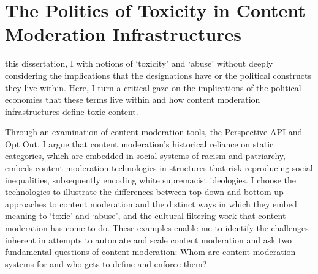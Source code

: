 \ifpdf
    \graphicspath{{Chapter7/Figs/Raster/}{Chapter7/Figs/PDF/}{Chapter7/Figs/}}
\else
    \graphicspath{{Chapter7/Figs/Vector/}{Chapter7/Figs/}}
\fi

\chapter[Politics of Toxicity in Content Moderation Infrastructures]{The Politics of Toxicity in Content Moderation Infrastructures\footnotemark{}}\label{chap:filter}

 this dissertation, I  with notions of `toxicity' and `abuse' without deeply considering the implications that the designations have or the political constructs they live within.
Here, I turn a critical gaze on the implications of the political economies that these terms live within and how content moderation infrastructures define toxic content.

Through an examination of  content moderation tools, the Perspective API and Opt Out, I argue that content moderation's historical reliance on static categories, which are embedded in social systems of racism and patriarchy, embeds content moderation technologies in structures that risk reproducing social inequalities, subsequently encoding white supremacist ideologies.
I choose the  technologies to illustrate the differences between top-down and bottom-up approaches to content moderation and the distinct ways in which they embed meaning to `toxic' and `abuse', and the cultural filtering work that content moderation has come to do.
These  examples enable me to identify the challenges inherent in attempts to automate and scale content moderation and ask two fundamental questions of content moderation: Whom are content moderation systems for and who gets to define and enforce them?

